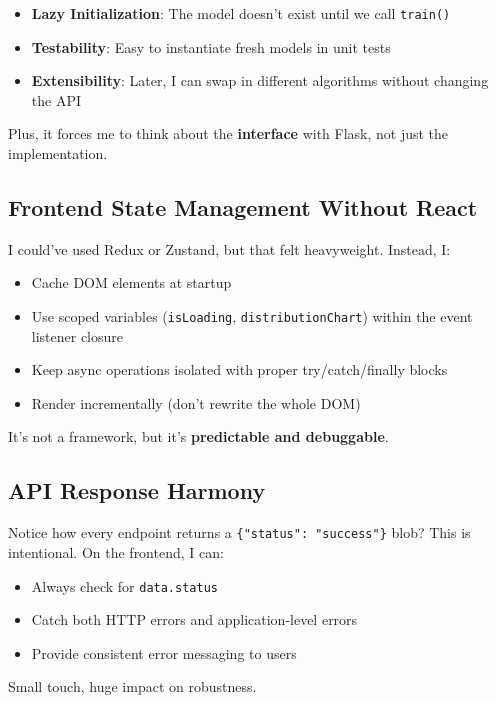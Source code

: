 \documentclass[12pt, a4paper]{article}
\begin{document}
\begin{itemize}
    \item \textbf{Lazy Initialization}: The model doesn't exist until we call \texttt{train()}
    \item \textbf{Testability}: Easy to instantiate fresh models in unit tests
    \item \textbf{Extensibility}: Later, I can swap in different algorithms without changing the API
\end{itemize}

Plus, it forces me to think about the \textbf{interface} with Flask, not just the implementation.

\subsection{Frontend State Management Without React}

I could've used Redux or Zustand, but that felt heavyweight. Instead, I:

\begin{itemize}
    \item Cache DOM elements at startup
    \item Use scoped variables (\texttt{isLoading}, \texttt{distributionChart}) within the event listener closure
    \item Keep async operations isolated with proper try/catch/finally blocks
    \item Render incrementally (don't rewrite the whole DOM)
\end{itemize}

It's not a framework, but it's \textbf{predictable and debuggable}.

\subsection{API Response Harmony}

Notice how every endpoint returns a \texttt{\{"status": "success"\}} blob? This is intentional. On the frontend, I can:

\begin{itemize}
    \item Always check for \texttt{data.status}
    \item Catch both HTTP errors and application-level errors
    \item Provide consistent error messaging to users
\end{itemize}

Small touch, huge impact on robustness.
\end{document}
